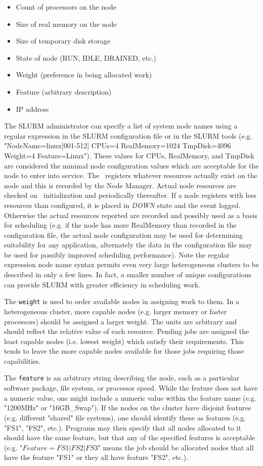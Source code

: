 \begin{itemize}
\item Count of processors on the node
\item Size of real memory on the node
\item Size of temporary disk storage
\item State of node (RUN, IDLE, DRAINED, etc.)
\item Weight (preference in being allocated work)
\item Feature (arbitrary description)
\item IP address
\end{itemize}

The SLURM administrator can specify a list of system node
names using a regular expression in the SLURM configuration file 
or in the SLURM tools (e.g. "NodeName=linux[001-512] CPUs=4
RealMemory=1024 TmpDisk=4096 Weight=4 Feature=Linux").  These values
for CPUs, RealMemory, and TmpDisk are considered the minimal
node configuration values which are acceptable for the node to enter
into service.  The \slurmd\ registers whatever resources actually
exist on the node and this is recorded by the Node Manager.
Actual node resources are checked on \slurmd\ initialization and
periodically thereafter.  
If a node registers with less resources than configured, it
is placed in {\em DOWN} state and the event logged.  Otherwise the
actual resources reported are recorded and possibly used as a basis 
for scheduling (e.g. if the node has more RealMemory than recorded in 
the configuration file, the actual node configuration may be used for 
determining suitability for any application, alternately the data in 
the configuration file may be used for possibly improved scheduling performance).
Note the regular expression node name syntax permits even very large
heterogeneous clusters to be described in only a few lines.  In fact,
a smaller number of unique configurations can provide SLURM with greater
efficiency in scheduling work.

The {\tt weight} is used to order available nodes in assigning work to them.
In a heterogeneous cluster, more capable nodes (e.g. larger memory
or faster processors) should be assigned a larger weight.  The units
are arbitrary and should reflect the relative value of each resource.
Pending jobs are assigned the least capable nodes (i.e. lowest
weight) which satisfy their requirements.  This tends to leave the
more capable nodes available for those jobs requiring those capabilities.

The {\tt feature} is an arbitrary string describing the node, such as
a particular software package, file system, or processor speed.
While the feature does not have a numeric value, one might include a
numeric value within the feature name (e.g. "1200MHz" or "16GB\_Swap").
If the nodes on the cluster have disjoint features (e.g. different
"shared" file systems), one should identify these as features (e.g. "FS1",
"FS2", etc.).  Programs may then specify that all nodes allocated to it
should have the same feature, but that any of the specified features is
acceptable (e.g. "$Feature=FS1|FS2|FS3$" means the job should be allocated 
nodes that all have the feature "FS1" or they all have feature "FS2", etc.).

